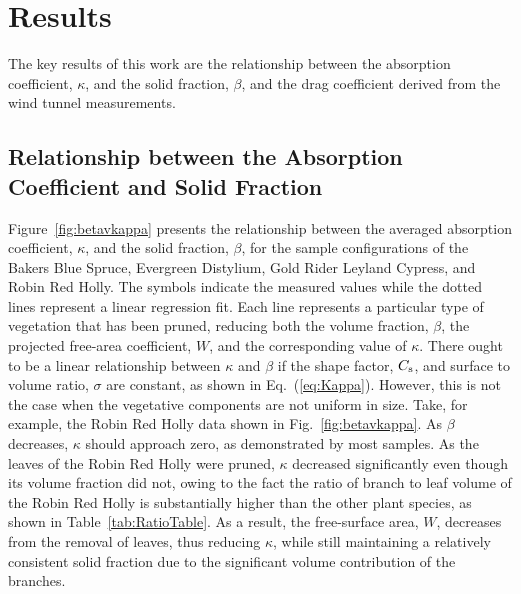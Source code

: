 \documentclass[12pt]{article}
\begin{document}
\pagebreak



\section{Results}
\label{sec:results}

The key results of this work are the relationship between the absorption coefficient, $\kappa$, and the solid fraction, $\beta$, and the drag coefficient derived from the wind tunnel measurements.

\subsection{Relationship between the Absorption Coefficient and Solid Fraction}

Figure~\ref{fig:betavkappa} presents the relationship between the averaged absorption coefficient, $\kappa$, and the solid fraction, $\beta$, for the sample configurations of the Bakers Blue Spruce, Evergreen Distylium, Gold Rider Leyland Cypress, and Robin Red Holly. The symbols indicate the measured values while the dotted lines represent a linear regression fit. Each line represents a particular type of vegetation that has been pruned, reducing both the volume fraction, $\beta$, the projected free-area coefficient, $W$, and the corresponding value of $\kappa$. There ought to be a linear relationship between $\kappa$ and $\beta$ if the shape factor, $C_{\rm s}$, and surface to volume ratio, $\sigma$ are constant, as shown in Eq.~(\ref{eq:Kappa}). However, this is not the case when the vegetative components are not uniform in size. Take, for example, the Robin Red Holly data shown in Fig.~\ref{fig:betavkappa}. As $\beta$ decreases, $\kappa$ should approach zero, as demonstrated by most samples. As the leaves of the Robin Red Holly were pruned, $\kappa$ decreased significantly even though its volume fraction did not, owing to the fact the ratio of branch to leaf volume of the Robin Red Holly is substantially higher than the other plant species, as shown in Table~\ref{tab:RatioTable}.  As a result, the free-surface area, $W$, decreases from the removal of leaves, thus reducing $\kappa$, while still maintaining a relatively consistent solid fraction due to the significant volume contribution of the branches.
\end{document}
